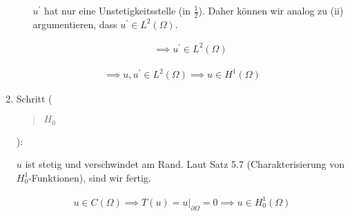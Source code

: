 \begin{solution}
\begin{enumerate}[label = \arabic*.]
\begin{enumerate}[label = (\roman*)]
    $u^\prime$ hat nur eine Unstetigkeitsstelle (in $\frac{1}{2}$).
    Daher können wir analog zu (ii) argumentieren, dass $u^\prime \in L^2(\Omega)$.

    \begin{align*}
      \implies
      u^\prime \in L^2(\Omega)
    \end{align*}

  \end{enumerate}

  \begin{align*}
    \implies
    u, u^\prime \in L^2(\Omega)
    \implies
    u \in H^1(\Omega)
  \end{align*}

  \item Schritt (\blockquote{$H_0$}):

  $u$ ist stetig und verschwindet am Rand.
  Laut Satz 5.7 (Charakterisierung von $H_0^1$-Funktionen), sind wir fertig.

  \begin{align*}
    u \in C(\Omega)
    \implies
    T(u) = u |_{\partial \Omega} = 0
    \implies
    u \in H_0^1(\Omega)
  \end{align*}

\end{enumerate}

\end{solution}

